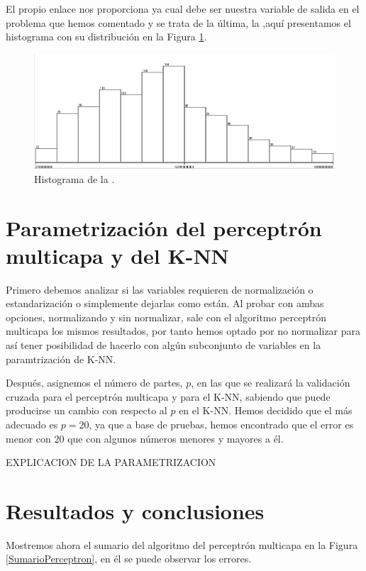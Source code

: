 \documentclass[a4paper, 11pt, twoside, openany, onecolumn, final]{memoir}
\begin{document}
	El propio enlace nos proporciona ya cual debe ser nuestra variable de salida en el problema que hemos comentado y se trata de la última, la ,aquí presentamos el histograma con su distribución en la Figura \ref{HistoVarSalidaRegre}.
	
	\begin{figure}
  		\centering
   	\includegraphics[width=1\textwidth]{Imagenes/HistogramaVarSalRegre}
  		\caption{Histograma de la .}
  		\label{HistoVarSalidaRegre}
	\end{figure}
	\section{Parametrización del perceptrón multicapa y del K-NN}
	Primero debemos analizar si las variables requieren de normalización o estandarización o simplemente dejarlas como están. Al probar con ambas opciones, normalizando y sin normalizar, sale con el algoritmo perceptrón multicapa los mismos resultados, por tanto hemos optado por no normalizar para así tener posibilidad de hacerlo con algún subconjunto de variables en la paramtrización de K-NN.
	
	Después, asignemos el número de partes, $p$, en las que se realizará la validación cruzada para el perceptrón multicapa y para el K-NN, sabiendo que puede producirse un cambio con respecto al $p$ en el K-NN. Hemos decidido que el más adecuado es $p=20$, ya que a base de pruebas, hemos encontrado que el error es menor con $20$ que con algunos números menores y mayores a él.
	
	EXPLICACION DE LA PARAMETRIZACION
	
	\section{Resultados y conclusiones}
	Mostremos ahora el sumario del algoritmo del perceptrón multicapa en la Figura \ref{SumarioPerceptron}, en él se puede observar los errores.
	
\end{document}
